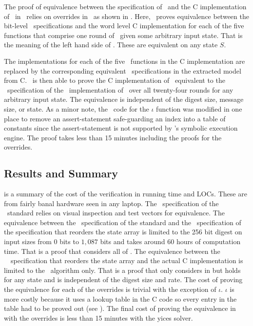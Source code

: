 The proof of equivalence between the specification of \keccak\ and the C implementation of \keccak\ in \openssl\ relies on overrides in \saw\ as shown in .
Here, \saw\ proves equivalence between the bit-level \cryptol\ specifications and the word level C implementation for each of the five functions that comprise one round of \keccak\ given some arbitrary input state.
That is the meaning of the left hand side of .
These are equivalent on any state $S$.

The implementations for each of the five \keccak\ functions in the C implementation are replaced by the corresponding equivalent \cryptol\ specifications in the extracted model from C.
\saw\ is then able to prove the C implementation of \keccak\ equivalent to the \cryptol\ specification of the \openssl\ implementation of \keccak\ over all twenty-four rounds for any arbitrary input state.
The equivalence is independent of the digest size, message size, or state.
As a minor note, the \openssl\ code for the $\iota$ function was modified in one place to remove an assert-statement safe-guarding an index into a table of constants since the assert-statement is not supported by \saw's symbolic execution engine. The proof takes less than 15 minutes including the proofs for the overrides.


\subsection{Results and Summary}

 is a summary of the cost of the verification in running time and LOCs. These are from fairly banal hardware seen in any laptop.
The \cryptol\ specification of the \fips\ standard relies on visual inspection and test vectors for equivalence.
The equivalence between the \cryptol\ specification of the standard and the \cryptol\ specification of the \openssl specification that reorders the state array is limited to the 256 bit digest on input sizes from $0$ bits to $1,087$ bits and takes around 60 hours of computation time.
That is a proof that considers all of .
The equivalence between the \openssl\ \cryptol\ specification that reorders the state array and the actual C implementation is limited to the \keccak\ algorithm only.
That is a proof that only considers  in  but holds for any state and is independent of the digest size and rate.
The cost of proving the equivalence for each of the overrides is trivial with the exception of $\iota$.
$\iota$ is more costly because it uses a lookup table in the C code so every entry in the table had to be proved out (see ).
The final cost of proving the equivalence in \keccak with the overrides is less than 15 minutes with the yices solver.



